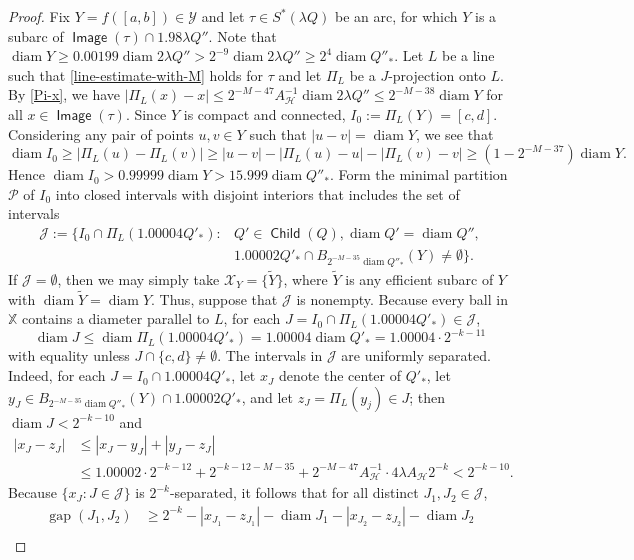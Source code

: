 \documentclass[12pt]{amsart}
\numberwithin{equation}{section}
\theoremstyle{plain}
\theoremstyle{definition}
\def\XX{{\mathbb{X}}}
\newcommand{\diam}{\mathop\mathrm{diam}\nolimits}
\newcommand{\Image}{\mathop\mathsf{Image}\nolimits}
\newcommand{\Child}{\mathop\mathsf{Child}\nolimits}
\newcommand{\gap}{\mathop\mathrm{gap}\nolimits}
\numberwithin{figure}{section}
\begin{document}
\begin{proof}
Fix $Y=f([a,b])\in \mathcal{Y}$ and let $\tau\in S^*(\lambda Q)$ be an arc, for which $Y$ is a subarc of $\Image(\tau)\cap 1.98\lambda Q''$. Note that $\diam Y\geq 0.00199\diam 2\lambda Q''> 2^{-9}\diam 2\lambda Q''\geq 2^{4}\diam Q''_*$. Let $L$ be a line such that \eqref{line-estimate-with-M} holds for $\tau$ and let $\Pi_L$ be a $J$-projection onto $L$. By \eqref{Pi-x}, we have $|\Pi_L(x)-x|\leq 2^{-M-47}A_\mathscr{H}^{-1}\diam 2\lambda Q''\leq 2^{-M-38}\diam Y$ for all $x\in \Image(\tau)$. Since $Y$ is compact and connected, $I_0:=\Pi_L(Y)=[c,d]$. Considering  any pair of points $u,v\in Y$ such that $|u-v|=\diam Y$, we see that $$\diam I_0\geq |\Pi_L(u)-\Pi_L(v)| \geq |u-v|-|\Pi_L(u)-u|-|\Pi_L(v)-v|\geq (1-2^{-M-37})\diam Y.$$ Hence $\diam I_0> 0.99999\diam Y>15.999\diam Q''_*$. Form the minimal partition $\mathcal{P}$ of $I_0$ into closed intervals with disjoint interiors that includes the set of intervals \begin{align*}
    \mathcal{J}:=\{I_0\cap \Pi_L(1.00004Q'_*):& Q'\in\Child(Q),\diam Q'=\diam Q'',\\ & 1.00002Q'_*\cap B_{2^{-M-35}\diam Q''_*}(Y)\neq\emptyset\}.
\end{align*} If $\mathcal{J}=\emptyset$, then we may simply take $\mathcal{X}_Y=\{\tilde Y\}$, where $\tilde Y$ is any efficient subarc of $Y$ with $\diam \tilde Y=\diam Y$. Thus, suppose that $\mathcal{J}$ is nonempty. Because every ball in $\XX$ contains a diameter parallel to $L$, for each $J=I_0\cap \Pi_L(1.00004Q'_*)\in\mathcal{J}$, $$\diam J\leq \diam \Pi_L(1.00004Q'_*)=1.00004\diam Q'_*=1.00004\cdot 2^{-k-11}$$ with equality unless $J\cap\{c,d\}\neq\emptyset$. The intervals in $\mathcal{J}$ are uniformly separated. Indeed, for each $J=I_0\cap 1.00004Q'_*$, let $x_J$ denote the center of $Q'_*$, let $y_J\in B_{2^{-M-35}\diam Q''_*}(Y)\cap 1.00002Q'_*$, and let $z_J=\Pi_L(y_j)\in J$; then $\diam J<2^{-k-10}$ and \begin{align*}
    |x_J-z_J|&\leq |x_J-y_J|+|y_J-z_J|\\
    &\leq 1.00002\cdot 2^{-k-12} + 2^{-k-12 -M-35} + 2^{-M-47}A_\mathscr{H}^{-1}\cdot 4\lambda A_\mathscr{H} 2^{-k} < 2^{-k-10}.
\end{align*} Because $\{x_J:J\in\mathcal{J}\}$ is $2^{-k}$-separated, it follows that for all distinct $J_1,J_2\in\mathcal{J}$, \begin{align*}\gap(J_1,J_2)&\geq 2^{-k}-|x_{J_1}-z_{J_1}|-\diam J_1-|x_{J_2}-z_{J_2}|-\diam J_2\\

\end{align*}
\end{proof}
\end{document}
